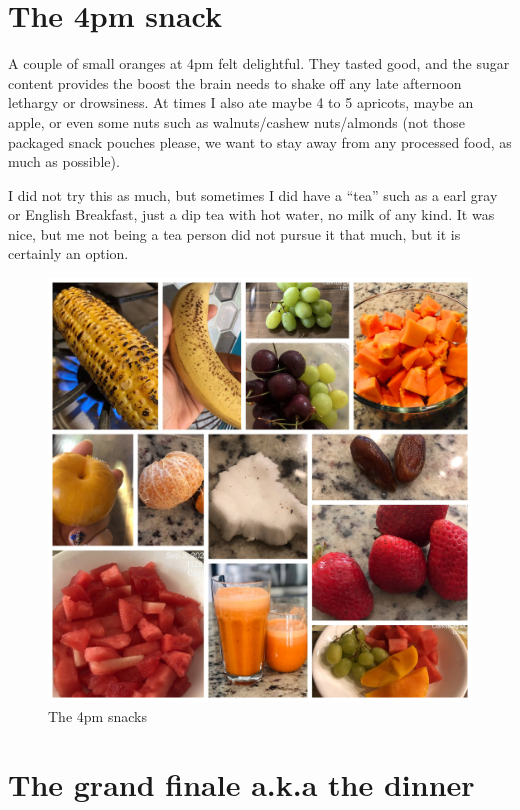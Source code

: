\documentclass[
  oneside]{book}
\begin{document}
\hypertarget{the-4pm-snack}{%
\section{The 4pm snack}\label{the-4pm-snack}}

A couple of small oranges at 4pm felt delightful. They tasted good, and the sugar content provides the boost the brain needs to shake off any late afternoon lethargy or drowsiness. At times I also ate maybe 4 to 5 apricots, maybe an apple, or even some nuts such as walnuts/cashew nuts/almonds (not those packaged snack pouches please, we want to stay away from any processed food, as much as possible).

I did not try this as much, but sometimes I did have a ``tea'' such as a earl gray or English Breakfast, just a dip tea with hot water, no milk of any kind. It was nice, but me not being a tea person did not pursue it that much, but it is certainly an option.

\begin{figure}
\centering
\includegraphics{pictures/4pm-snacks.JPG}
\caption{The 4pm snacks}
\end{figure}

\pagebreak

\hypertarget{the-grand-finale-a.k.a-the-dinner}{%
\section{The grand finale a.k.a the dinner}\label{the-grand-finale-a.k.a-the-dinner}}
\end{document}
